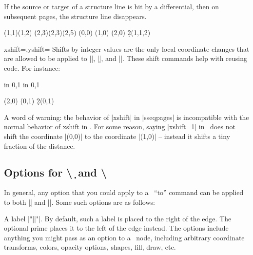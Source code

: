 \documentclass{ltxdoc}
\makeatletter
\def\sectionstring{\textbackslash\@xp\@gobble\string}
\newenvironment{manualentry}[1]{
    \begin{pgfmanualentry}
    \pgfmanualentryheadline{#1}
    \pgfmanualbody
}{
    \end{pgfmanualentry}
}
\makeatother
\begin{document}
\begin{sseqdata}[name=ex1,degree={#1}{1-#1}]
\begin{command}{\structline{}}
If the source or target of a structure line is hit by a differential, then on subsequent pages, the structure line disappears.
\begin{codeexample}[width=9cm]
\sseqnewgroup{}
\begin{sseqdata}[name=structline example,
                 classes={circle,fill},
                 Adams grading, no axes]
\class(1,1)\class(1,2)
\class(2,3)\class(2,3)\class(2,5)
\tower[classes=blue](0,0)
\tower[struct lines=dashed,orange](1,0)
\tower[struct lines=red](2,0)
\d2(1,1,2)
\end{sseqdata}
\printpage[name=structline example,page=2]
\hskip1cm
\printpage[name=structline example,page=3]
\end{codeexample}
\end{command}

\begin{keylist}{xshift=,yshift=}
Shifts by integer values are the only local coordinate changes that are allowed to be applied to |\class|, |\d|, and |\structline|. These shift commands help with reusing code. For instance:
\begin{codeexample}[width=6cm]
\begin{sseqpage}
\foreach \x in {0,1} \foreach \y in {0,1}{
    \begin{scope}[xshift=\x,yshift=\y]
    \class(2,0)
    \class(0,1)
    \d2(0,1)
    \end{scope}
}
\end{sseqpage}
\end{codeexample}
A word of warning: the behavior of |xshift| in |sseqpages| is incompatible with the normal behavior of xshift in \tikzname. For some reason, saying |xshift=1| in \tikzname\ does not shift the coordinate |(0,0)| to the coordinate |(1,0)| -- instead it shifts a tiny fraction of the distance.
\end{keylist}

\subsection{Options for \sectionstring\d\ and \sectionstring\structline}
In general, any option that you could apply to a \tikzname\ ``to'' command can be applied to both |\d| and |\structline|. Some such options are as follows:
\begin{manualentry}{|"|\meta{text}|"|\opt{\ttfamily '}\opt{\meta{options}}}
A label |"||"|. By default, such a label is placed to the right of the edge. The optional prime places it to the left of the edge instead. The options include anything you might pass as an option to a \tikzname\ node, including arbitrary coordinate transforms, colors, opacity options, shapes, fill, draw, etc.


\end{manualentry}
\end{sseqdata}
\end{document}
